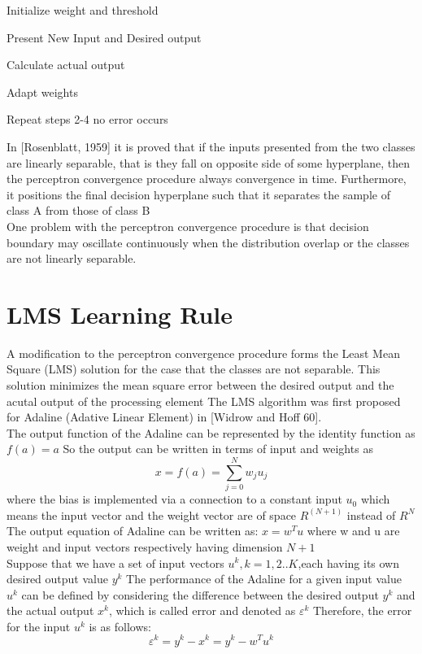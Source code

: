 \documentclass[12pt, a4paper, twoside]{book}
\begin{document}
\begin{steps}
    \item Initialize weight and threshold
    \item Present New Input and Desired output
    \item Calculate actual output
    \item Adapt weights
    \item Repeat steps 2-4 no error occurs
\end{steps}

In [Rosenblatt, 1959] it is proved that if the inputs presented from the two classes
are linearly separable, that is they fall on opposite side of some hyperplane, then the perceptron convergence
procedure always convergence in time. Furthermore, it positions the final decision hyperplane such that it separates the sample of class A
from those of class B \\

One problem with the perceptron convergence procedure is that decision boundary may oscillate continuously when the distribution overlap or the classes are not linearly separable.

\section{LMS Learning Rule}
A modification to the perceptron convergence procedure forms the Least Mean Square (LMS) solution for the case that the classes are not separable.
This solution minimizes the mean square error between the desired output and the acutal output of the processing element
The LMS algorithm was first proposed for Adaline (Adative Linear Element) in [Widrow and Hoff 60]. \\


The output function of the Adaline can be represented by the identity function as $f(a)=a$
So the output can be written in terms of input and weights as 
\[x=f(a)=\sum_{j = 0}^{N} w_ju_j\] 
where the bias is implemented via a connection to a constant input $u_0$ 
which means the input vector and the weight vector are of space $R^{(N+1)}$ instead of $R^N$ 
The output equation of Adaline can be written as: $ x=w^Tu$ where w and u are weight and input vectors respectively having dimension $N+1$ \\
  

Suppose that we have a set of input vectors $u^k, k=1,2..K$,each having its own desired output value $y^k$
The performance of the Adaline for a given input value $u^k$ can be defined by considering the difference between the desired output $y^k$ and 
the actual output $x^k$, which is called error and denoted as $\varepsilon^k$
Therefore, the error for the input $u^k$ is as follows: 
\[\varepsilon^k=y^k-x^k=y^k-w^Tu^k\]
\end{document}
